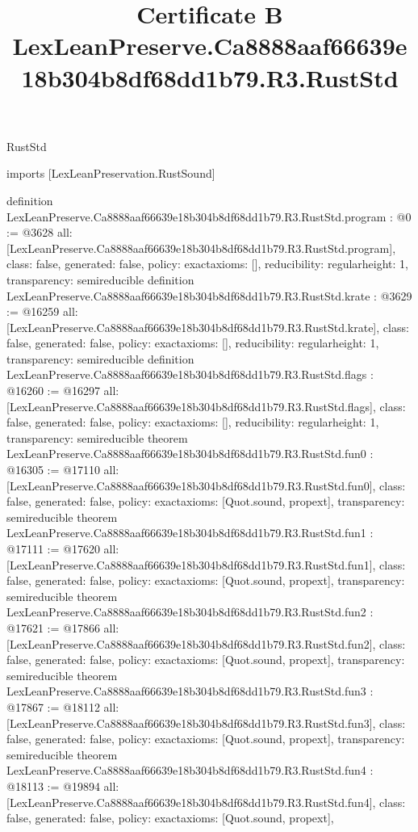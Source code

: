 \begin{lexlean}{RustStd}
\title{Certificate B LexLeanPreserve.Ca8888aaf66639e18b304b8df68dd1b79.R3.RustStd}
\begin{coremodule}
imports [LexLeanPreservation.RustSound]

definition LexLeanPreserve.Ca8888aaf66639e18b304b8df68dd1b79.R3.RustStd.program : @0 := @3628 {
  all: [LexLeanPreserve.Ca8888aaf66639e18b304b8df68dd1b79.R3.RustStd.program],
  class: false,
  generated: false,
  policy: exact{axioms: []},
  reducibility: regular{height: 1},
  transparency: semireducible
}
definition LexLeanPreserve.Ca8888aaf66639e18b304b8df68dd1b79.R3.RustStd.krate : @3629 := @16259 {
  all: [LexLeanPreserve.Ca8888aaf66639e18b304b8df68dd1b79.R3.RustStd.krate],
  class: false,
  generated: false,
  policy: exact{axioms: []},
  reducibility: regular{height: 1},
  transparency: semireducible
}
definition LexLeanPreserve.Ca8888aaf66639e18b304b8df68dd1b79.R3.RustStd.flags : @16260 := @16297 {
  all: [LexLeanPreserve.Ca8888aaf66639e18b304b8df68dd1b79.R3.RustStd.flags],
  class: false,
  generated: false,
  policy: exact{axioms: []},
  reducibility: regular{height: 1},
  transparency: semireducible
}
theorem LexLeanPreserve.Ca8888aaf66639e18b304b8df68dd1b79.R3.RustStd.fun0 : @16305 := @17110 {
  all: [LexLeanPreserve.Ca8888aaf66639e18b304b8df68dd1b79.R3.RustStd.fun0],
  class: false,
  generated: false,
  policy: exact{axioms: [Quot.sound, propext]},
  transparency: semireducible
}
theorem LexLeanPreserve.Ca8888aaf66639e18b304b8df68dd1b79.R3.RustStd.fun1 : @17111 := @17620 {
  all: [LexLeanPreserve.Ca8888aaf66639e18b304b8df68dd1b79.R3.RustStd.fun1],
  class: false,
  generated: false,
  policy: exact{axioms: [Quot.sound, propext]},
  transparency: semireducible
}
theorem LexLeanPreserve.Ca8888aaf66639e18b304b8df68dd1b79.R3.RustStd.fun2 : @17621 := @17866 {
  all: [LexLeanPreserve.Ca8888aaf66639e18b304b8df68dd1b79.R3.RustStd.fun2],
  class: false,
  generated: false,
  policy: exact{axioms: [Quot.sound, propext]},
  transparency: semireducible
}
theorem LexLeanPreserve.Ca8888aaf66639e18b304b8df68dd1b79.R3.RustStd.fun3 : @17867 := @18112 {
  all: [LexLeanPreserve.Ca8888aaf66639e18b304b8df68dd1b79.R3.RustStd.fun3],
  class: false,
  generated: false,
  policy: exact{axioms: [Quot.sound, propext]},
  transparency: semireducible
}
theorem LexLeanPreserve.Ca8888aaf66639e18b304b8df68dd1b79.R3.RustStd.fun4 : @18113 := @19894 {
  all: [LexLeanPreserve.Ca8888aaf66639e18b304b8df68dd1b79.R3.RustStd.fun4],
  class: false,
  generated: false,
  policy: exact{axioms: [Quot.sound, propext]},
}
\end{coremodule}
\end{lexlean}
